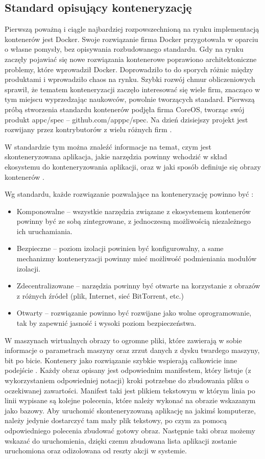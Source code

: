 \documentclass[10pt,a4paper,titlepage,twoside]{report}
\begin{document}
\subsection{Standard opisujący konteneryzację}\indent \indent
Pierwszą poważną i ciągle najbardziej rozpowszechnioną na rynku implementacją kontenerów jest Docker\cite{ad22}. Swoje rozwiązanie firma Docker przygotowała w oparciu o własne pomysły, bez opisywania rozbudowanego standardu. Gdy na rynku zaczęły pojawiać się nowe rozwiązania kontenerowe poprawiono architektoniczne problemy, które wprowadził Docker. Doprowadziło to do sporych różnic między produktami i wprowadziło chaos na rynku. Szybki rozwój chmur obliczeniowych sprawił, że tematem konteneryzacji zaczęło interesować się wiele firm, znacząco w tym miejscu wyprzedzając naukowców, powolnie tworzących standard. Pierwszą próbą stworzenia standardu kontenerów podjęła firma CoreOS, tworząc swój produkt appc/spec – github.com/apppc/spec. Na dzień dzisiejszy projekt jest rozwijany przez kontrybutorów z wielu różnych firm \cite{ad23}. 

\indent \indent W standardzie tym można znaleźć informacje na temat, czym jest skonteneryzowana aplikacja, jakie narzędzia powinny wchodzić w skład ekosystemu do konteneryzowania aplikacji, oraz w jaki sposób definiuje się obrazy kontenerów \cite{ad23}.

\indent \indent Wg standardu, każde rozwiązanie pozwalające na konteneryzację powinno być \cite{ad23}:
\begin{itemize}
	\item Komponowalne – wszystkie narzędzia związane z ekosystemem kontenerów powinny być ze sobą zintegrowane, z jednoczesną możliwością niezależnego ich uruchamiania.
	\item Bezpieczne – poziom izolacji powinien być konfigurowalny, a same mechanizmy konteneryzacji powinny mieć możliwość podmieniania modułów izolacji.
	\item Zdecentralizowane – narzędzia powinny być otwarte na korzystanie z obrazów z różnych źródeł (plik, Internet, sieć BitTorrent, etc.)
	\item Otwarty – rozwiązanie powinno być rozwijane jako wolne oprogramowanie, tak by zapewnić jasność i wysoki poziom bezpieczeństwa.
\end{itemize}

W maszynach wirtualnych obrazy to ogromne pliki, które zawierają w sobie informacje o parametrach maszyny oraz zrzut danych z dysku twardego maszyny, bit po bicie. Kontenery jako rozwiązanie szybkie wspierają całkowicie inne podejście \cite{ad24}. Każdy obraz opisany jest odpowiednim manifestem, który listuje (z wykorzystaniem odpowiedniej notacji) kroki potrzebne do zbudowania pliku o oczekiwanej zawartości. Manifest taki jest plikiem tekstowym w którym linia po linii wypisane są kolejne polecenia, które należy wykonać na obrazie wskazanym jako bazowy. Aby uruchomić skonteneryzowaną aplikację na jakimś komputerze, należy jedynie dostarczyć tam mały plik tekstowy, po czym za pomocą odpowiedniego polecenia zbudować gotowy obraz. Następnie taki obraz możemy wskazać do uruchomienia, dzięki czemu zbudowana lista aplikacji zostanie uruchomiona oraz odizolowana od reszty akcji w systemie.
\end{document}

